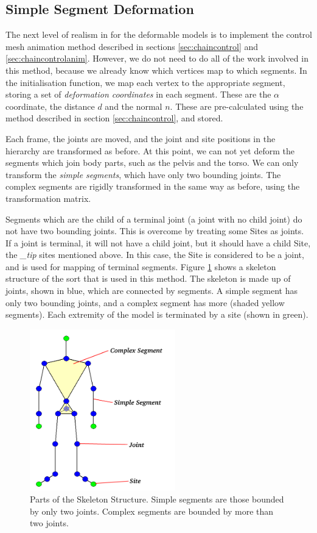 \documentclass[10pt,oneside,fleqn,a4paper]{book}
\begin{document}
\subsection{\label{sec:vrmlsimple}Simple Segment Deformation}
The next level of realism in for the deformable models is to implement the control mesh animation method described in sections \ref{sec:chaincontrol} and \ref{sec:chaincontrolanim}. However, we do not need to do all of the work involved in this method, because we already know which vertices map to which segments. In the initialisation function, we map each vertex to the appropriate segment, storing a set of {\it deformation coordinates} in each segment. These are the $\alpha$ coordinate, the distance $d$ and the normal $n$. These are pre-calculated using the method described in section \ref{sec:chaincontrol}, and stored.

Each frame, the joints are moved, and the joint and site positions in the hierarchy are transformed as before. At this point, we can not yet deform the segments which join body parts, such as the pelvis and the torso. We can only transform the {\it simple segments}, which have only two bounding joints. The complex segments are rigidly transformed in the same way as before, using the transformation matrix.

Segments which are the child of a terminal joint (a joint with no child joint) do not have two bounding joints. This is overcome by treating some Sites as joints. If a joint is terminal, it will not have a child joint, but it should have a child Site, the {\it \_tip} sites mentioned above. In this case, the Site is considered to be a joint, and is used for mapping of terminal segments. Figure \ref{fig:skeleton} shows a skeleton structure of the sort that is used in this method. The skeleton is made up of joints, shown in blue, which are connected by segments. A simple segment has only two bounding joints, and a complex segment has more (shaded yellow segments). Each extremity of the model is terminated by a site (shown in green).

\begin{figure}
\begin{center}
\includegraphics[height=7cm]{../images/skeleton}
\caption[Parts of the Skeleton Structure]{\label{fig:skeleton} Parts of the Skeleton Structure. Simple segments are those bounded by only two joints. Complex segments are bounded by more than two joints.}
\end{center}
\end{figure}
\end{document}
